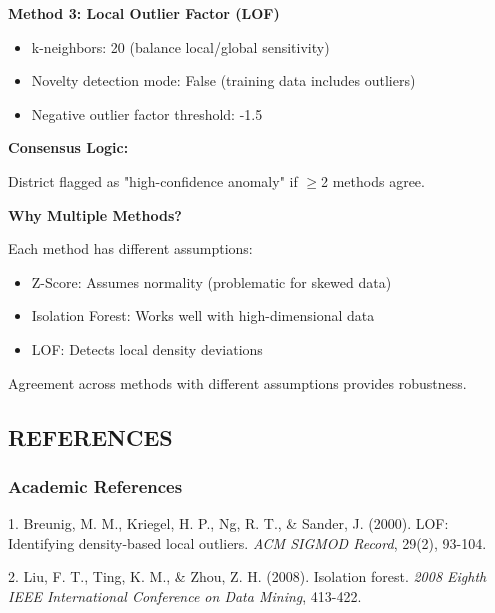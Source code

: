 \documentclass[11pt, a4paper]{article}
\begin{document}
\textbf{Method 3: Local Outlier Factor (LOF)}


\begin{itemize}
\item k-neighbors: 20 (balance local/\allowbreak global sensitivity)

\item Novelty detection mode: False (training data includes outliers)

\item Negative outlier factor threshold: -1.5
\end{itemize}

\textbf{Consensus Logic:}

District flagged as "high-confidence anomaly" if $\ge$2 methods agree.


\textbf{Why Multiple Methods?}

Each method has different assumptions:


\begin{itemize}
\item Z-Score: Assumes normality (problematic for skewed data)

\item Isolation Forest: Works well with high-dimensional data

\item LOF: Detects local density deviations
\end{itemize}

Agreement across methods with different assumptions provides robustness.




\clearpage
\subsection*{REFERENCES}

\clearpage
\subsubsection*{Academic References}

1. Breunig, M. M., Kriegel, H. P., Ng, R. T., \& Sander, J. (2000). LOF: Identifying density-based local outliers. \textit{ACM SIGMOD Record}, 29(2), 93-104.


2. Liu, F. T., Ting, K. M., \& Zhou, Z. H. (2008). Isolation forest. \textit{2008 Eighth IEEE International Conference on Data Mining}, 413-422.
\end{document}
